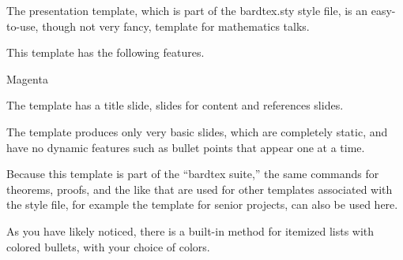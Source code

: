 \documentclass[12pt, oneside, reqno]{article}
\begin{document}


\startmain


The presentation template, which is part of the \textsf{bardtex.sty} style file, is an easy-to-use, though not very fancy, template for mathematics talks.

This template has the following features.

\begin{itemizecp}{Magenta}
\item 
The template has a title slide, slides for content and references slides.

\item
The template produces only very basic slides, which are completely static, and have no dynamic features such as bullet points that appear one at a time.

\item
Because this template is part of the ``bardtex suite,'' the same commands for theorems, proofs, and the like that are used for other templates associated with the style file, for example the template for senior projects, can also be used here.

\item
As you have likely noticed, there is a built-in method for itemized lists with colored bullets, with your choice of colors. 
\end{itemizecp}



\end{document}
